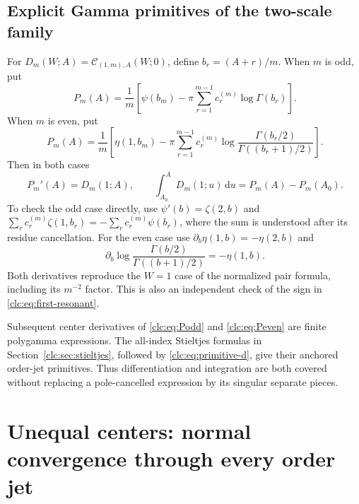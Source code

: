 \documentclass[11pt,a4paper]{article}
\numberwithin{equation}{section}
\theoremstyle{definition}\newtheorem{definition}[theorem]{Definition}
\theoremstyle{remark}\newtheorem{remark}[theorem]{Remark}
\newcommand{\dd}{\,\mathrm d}
\newcommand{\CC}{\mathcal C}\newcommand{\UU}{\mathcal U}\newcommand{\EE}{\mathcal E}
\begin{document}
\subsection{Explicit Gamma primitives of the two-scale family}
For $D_m(W;A)=\CC_{(1,m),A}(W;0)$, define $b_r=(A+r)/m$.
When $m$ is odd, put
\begin{equation}\label{clc:eq:Podd}
 P_m(A)=\frac1m\left[\psi(b_m)
                  -\pi\sum_{r=1}^{m-1}c_r^{(m)}\log\Gamma(b_r)\right].
\end{equation}
When $m$ is even, put
\begin{equation}\label{clc:eq:Peven}
 P_m(A)=\frac1m\left[\eta(1,b_m)-\pi\sum_{r=1}^{m-1}c_r^{(m)}
 \log\frac{\Gamma(b_r/2)}{\Gamma((b_r+1)/2)}\right].
\end{equation}
Then in both cases
\begin{equation}\label{clc:eq:Pderivative}
 P_m'(A)=D_m(1;A),\qquad
 \int_{A_0}^AD_m(1;u)\dd u=P_m(A)-P_m(A_0).
\end{equation}
To check the odd case directly, use
$\psi'(b)=\zeta(2,b)$ and
$\sum_rc_r^{(m)}\zeta(1,b_r)=-\sum_rc_r^{(m)}\psi(b_r)$,
where the sum is understood after its residue cancellation.
For the even case use
$\partial_b\eta(1,b)=-\eta(2,b)$ and
\[
 \partial_b\log\frac{\Gamma(b/2)}{\Gamma((b+1)/2)}=-\eta(1,b).
\]
Both derivatives reproduce the $W=1$ case of the normalized pair formula,
including its $m^{-2}$ factor. This is also an independent check of the
sign in \eqref{clc:eq:first-resonant}.

Subsequent center derivatives of \eqref{clc:eq:Podd} and
\eqref{clc:eq:Peven} are finite polygamma expressions. The all-index
Stieltjes formulas in Section~\ref{clc:sec:stieltjes}, followed by
\eqref{clc:eq:primitive-d}, give their anchored order-jet primitives.
Thus differentiation and integration are both covered without replacing
a pole-cancelled expression by its singular separate pieces.

\section{Unequal centers: normal convergence through every order jet}
\label{clc:sec:unequal}
\end{document}
